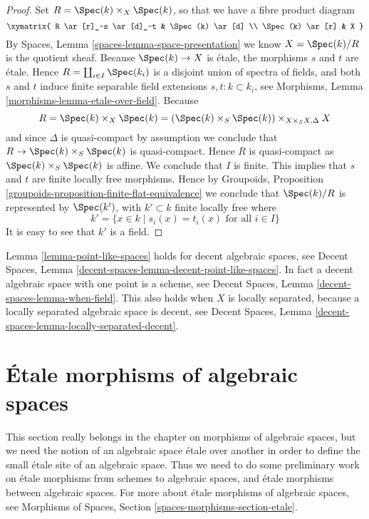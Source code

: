 \begin{proof}
Set $R = \Spec(k) \times_X \Spec(k)$, so that we have a
fibre product diagram
$$
\xymatrix{
R \ar[r]_-s \ar[d]_-t & \Spec(k) \ar[d] \\
\Spec(k) \ar[r] & X
}
$$
By
Spaces, Lemma \ref{spaces-lemma-space-presentation}
we know $X = \Spec(k)/R$ is the quotient sheaf.
Because $\Spec(k) \to X$ is \'etale, the morphisms $s$ and $t$ are
\'etale. Hence $R = \coprod_{i \in I} \Spec(k_i)$ is a disjoint
union of spectra of fields, and both $s$ and $t$
induce finite separable field extensions $s, t : k \subset k_i$, see
Morphisms, Lemma \ref{morphisms-lemma-etale-over-field}.
Because
$$
R = \Spec(k) \times_X \Spec(k)
= (\Spec(k) \times_S \Spec(k)) \times_{X \times_S X, \Delta} X
$$
and since $\Delta$ is quasi-compact by assumption we conclude that
$R \to \Spec(k) \times_S \Spec(k)$ is quasi-compact.
Hence $R$ is quasi-compact as $\Spec(k) \times_S \Spec(k)$ is
affine. We conclude that $I$ is finite. This implies
that $s$ and $t$ are finite locally free morphisms. Hence by
Groupoids, Proposition \ref{groupoids-proposition-finite-flat-equivalence}
we conclude that $\Spec(k)/R$ is
represented by $\Spec(k')$, with $k' \subset k$ finite locally free
where
$$
k' = \{x \in k \mid s_i(x) = t_i(x)\text{ for all }i \in I\}
$$
It is easy to see that $k'$ is a field.
\end{proof}

\begin{remark}
\label{remark-cannot-decide-yet}
Lemma \ref{lemma-point-like-spaces} holds for decent algebraic spaces, see
Decent Spaces, Lemma \ref{decent-spaces-lemma-decent-point-like-spaces}.
In fact a decent algebraic space with one point is a scheme, see
Decent Spaces, Lemma \ref{decent-spaces-lemma-when-field}.
This also holds when $X$ is locally separated, because a
locally separated algebraic space is decent, see
Decent Spaces, Lemma \ref{decent-spaces-lemma-locally-separated-decent}.
\end{remark}







\section{\'Etale morphisms of algebraic spaces}
\label{section-etale-morphisms}

\noindent
This section really belongs in the chapter on morphisms of algebraic
spaces, but we need the notion of an algebraic space \'etale over another
in order to define the small \'etale site of an algebraic space.
Thus we need to do some preliminary work on \'etale morphisms from schemes to
algebraic spaces, and \'etale morphisms between algebraic spaces.
For more about \'etale morphisms of algebraic spaces, see
Morphisms of Spaces, Section \ref{spaces-morphisms-section-etale}.

